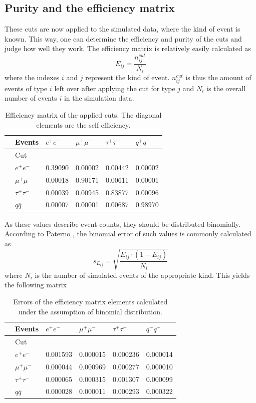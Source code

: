 \newpage
\subsection{Purity and the efficiency matrix}
These cuts are now applied to the simulated data, where the kind of event is known. This way, one can determine the efficiency and purity of the cuts and judge how well they work. 
The efficiency matrix is relatively easily calculated as
\begin{equation}
E_{ij}=\frac{n^{cut}_{ij}}{N_i}
\end{equation}
where the indexes $i$ and $j$ represent the kind of event. $n_{ij}^{cut}$ is thus the amount of events of type $i$ left over after applying the cut for type $j$ and $N_i$ is the overall number of events $i$ in the simulation data.
\begin{table}[H]\centering
	\begin{tabular}{@{}llllll@{}}
		\toprule
		&Events &$e^+e^-$&$\mu^+\mu^-$&$\tau^+\tau^-$&$q^+q^-$\\
		\midrule
		&Cut&&&&\\
		&$e^+e^-$&0.39090&0.00002&0.00442&0.00002\\
		&$\mu^+\mu^-$&0.00018&0.90171&0.00611&0.00001\\
		&$\tau^+\tau^-$&0.00039&0.00945&0.83877&0.00096\\
		&$q\overline{q}$&0.00007&0.00001&0.00687&0.98970\\
	\end{tabular}
	\caption[Efficiency matrix]{Efficiency matrix of the applied cuts. The diagonal elements are the self efficiency.}
	\label{tb:efficiency}
\end{table}

As these values describe event counts, they should be distributed binomially. According to Paterno \cite{binpaper}, the binomial error of such values is commonly calculated as
\begin{equation}
s_{E_{ij}}=\sqrt{\frac{E_{ij}\cdot(1-E_{ij})}{N_i}}
\end{equation}
where $N_i$ is the number of simulated events of the appropriate kind. This yields the following matrix

\begin{table}[H]\centering
	\begin{tabular}{@{}llllll@{}}
		\toprule
		&Events &$e^+e^-$&$\mu^+\mu^-$&$\tau^+\tau^-$&$q^+q^-$\\
		\midrule
		&Cut&&&&\\
		&$e^+e^-$&0.001593&0.000015&0.000236&0.000014\\
		&$\mu^+\mu^-$&0.000044&0.000969&0.000277&0.000010\\
		&$\tau^+\tau^-$&0.000065&0.000315&0.001307&0.000099\\
		&$q\overline{q}$&0.000028&0.000011&0.000293&0.000322\\
		\bottomrule
	\end{tabular}
	\caption[Efficiency error matrix]{Errors of the efficiency matrix elements calculated under the assumption of binomial distribution.}
	\label{tb:efficiencyerr}
\end{table}

